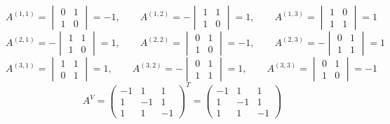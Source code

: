 \documentclass[a4paper]{article}
\theoremstyle{definition}
\theoremstyle{plain}
\begin{document}
\begin{equation*}
  A^{(1,1)}=
  \begin{vmatrix}
    0 & 1\\
    1 & 0
  \end{vmatrix}
  = -1
  , \qquad
  A^{(1, 2)} = -
  \begin{vmatrix}
    1 & 1\\
    1 & 0
  \end{vmatrix}
  = 1, \qquad
  A^{(1, 3)} =
  \begin{vmatrix}
    1 & 0\\
    1 & 1
  \end{vmatrix}
  = 1
\end{equation*}
\begin{equation*}
  A^{(2, 1)} = -
  \begin{vmatrix}
    1 & 1\\
    1 & 0
  \end{vmatrix}
  = 1, \qquad
  A^{(2, 2)} =
  \begin{vmatrix}
    0 & 1\\
    1 & 0
  \end{vmatrix}
  = -1, \qquad
  A^{(2, 3)} = -
  \begin{vmatrix}
    0 & 1\\
    1 & 1
  \end{vmatrix}
  = 1
\end{equation*}
\begin{equation*}
  A^{(3, 1)} =
  \begin{vmatrix}
    1 & 1\\
    0 & 1
  \end{vmatrix}
  = 1, \qquad
  A^{(3, 2)} = -
  \begin{vmatrix}
    0 & 1\\
    1 & 1
  \end{vmatrix}
  = 1, \qquad
  A^{(3, 3)} =
  \begin{vmatrix}
    0 & 1\\
    1 & 0
  \end{vmatrix}
  = -1
\end{equation*}
\begin{equation*}
  A^{V} =
  \begin{pmatrix}
    -1 & 1 & 1\\
    1 & -1 & 1\\
    1 & 1 & -1
  \end{pmatrix}^{T}
  =
  \begin{pmatrix}
    -1 & 1 & 1\\
    1 & -1 & 1\\
    1 & 1 & -1
  \end{pmatrix}
\end{equation*}
\end{document}
